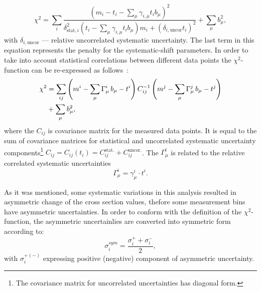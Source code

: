 \begin{equation}
 \chi^2 = \sum_i{ \frac{\left( m_i-t_i-\sum_{\mu}{\gamma_{i,\mu} t_i b_\mu} \right)^2 }{ \delta_{\text{stat},i}^2\left( t_i - \sum_\mu{\gamma_{i,\mu}t_ib_\mu} \right)m_i + \left( \delta_{i,\text{uncor}}t_i\right)^2 } } + \sum_{\mu}{b_\mu^2},
 \label{eq:chi2uncorr}
\end{equation}
with $\delta_{i,\text{uncor}}$ --- relative uncorrelated systematic uncertainty. The last term in this equation represents the penalty for the systematic-shift parameters. In order to take into account statistical correlations between different data points the $\chi^2$-function can be re-expressed as follows~\cite{Aaron:2009aa}:
\begin{align}
 \chi^2 &= \sum_{ij}{\left( m^i -\sum_{\mu}{\Gamma_\mu^i\,b_\mu - t^i }\right) C^{-1}_{ij} \left( m^j -\sum_{\mu}{\Gamma_\mu^j\,b_\mu - t^j }\right) }\notag\\
                                           &+ \sum_{\mu}{b_\mu^2},
 \label{eq:chi2corr}
\end{align}
where the $C_{ij}$ is covariance matrix for the measured data points. It is equal to the sum of covariance matrices for statistical and uncorrelated systematic uncertainty components\footnote{The covariance matrix for uncorrelated uncertainties has diagonal form.} $C_{ij}=C_{ij}\left(t_i\right)=C_{ij}^{\text{stat.}}+C_{ij}^{\text{uncor.}}$. The $\Gamma_\mu^l$ is related to the relative correlated systematic uncertainties
\begin{equation}
 \Gamma_{\mu}^i = \gamma_{\mu}^i \cdot t^i. 
\end{equation}

As it was mentioned, some systematic variations in this analysis resulted in asymmetric change of the cross section values, thefore some measurement bins have asymmetric uncertainties. In order to conform with the definition of the $\chi^2$-function, the asymmetric uncertainlies are converted into symmetric form according to:
\begin{equation}
 \sigma_i^{sym} = \frac{\sigma_i^+ + \sigma_i^-}{2},
\end{equation}
with $\sigma_i^{+\left(-\right)}$ expressing positive (negative) component of asymmetric uncertainty.

